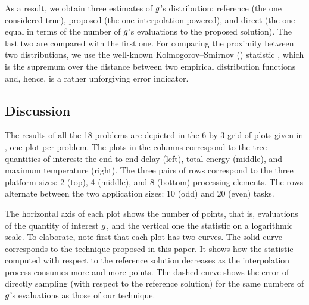 As a result, we obtain three estimates of $g$'s distribution: reference (the
one considered true), proposed (the one interpolation powered), and direct (the
one equal in terms of the number of $g$'s evaluations to the proposed
solution). The last two are compared with the first one. For comparing the
proximity between two distributions, we use the well-known Kolmogorov--Smirnov
() statistic \cite{rao2009}, which is the supremum over the distance
between two empirical distribution functions and, hence, is a rather unforgiving
error indicator.


\subsection{Discussion}
The results of all the 18 problems are depicted in the 6-by-3 grid of plots
given in , one plot per problem. The plots in the columns
correspond to the tree quantities of interest: the end-to-end delay (left),
total energy (middle), and maximum temperature (right). The three pairs of rows
correspond to the three platform sizes: 2 (top), 4 (middle), and 8 (bottom)
processing elements. The rows alternate between the two application sizes: 10
(odd) and 20 (even) tasks.

The horizontal axis of each plot shows the number of points, that is,
evaluations of the quantity of interest $g$, and the vertical one the 
statistic on a logarithmic scale. To elaborate, note first that each plot has
two curves. The solid curve corresponds to the technique proposed in this paper.
It shows how the  statistic computed with respect to the reference
solution decreases as the interpolation process consumes more and more points.
The dashed curve shows the error of directly sampling (with respect to the
reference solution) for the same numbers of $g$'s evaluations as those of our
technique.
